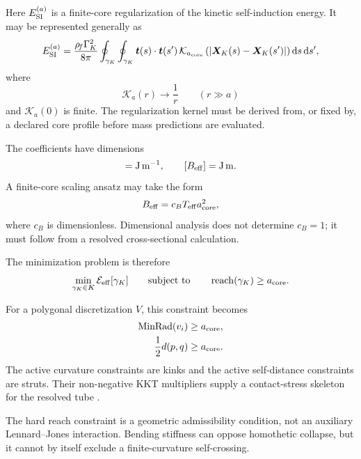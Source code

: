 Here \(E_{\rm SI}^{(a)}\) is a finite-core regularization of the kinetic
self-induction energy.  It may be represented generally as
\begin{equation}
E_{\rm SI}^{(a)}
=
\frac{\rho_{\!f}\Gamma_K^2}{8\pi}
\oint_{\gamma_K}
\oint_{\gamma_K}
\bm{t}(s)\cdot\bm{t}(s')\,
\mathcal{K}_{a_{\rm core}}
\left(
\left|
\bm{X}_K(s)-\bm{X}_K(s')
\right|
\right)
\dd s\,\dd s',
\label{eq:RT-regularized-self-induction}
\end{equation}
where
\begin{equation}
\mathcal{K}_{a}(r)
\longrightarrow
\frac{1}{r}
\qquad
(r\gg a)
\end{equation}
and \(\mathcal{K}_{a}(0)\) is finite.  The regularization kernel must be
derived from, or fixed by, a declared core profile before mass predictions
are evaluated.

The coefficients have dimensions
\begin{equation}
[T_{\rm eff}]
=
\mathrm{J\,m^{-1}},
\qquad
[B_{\rm eff}]
=
\mathrm{J\,m}.
\end{equation}
A finite-core scaling ansatz may take the form
\begin{equation}
B_{\rm eff}
=
c_B T_{\rm eff}a_{\rm core}^2,
\label{eq:RT-bending-scaling}
\end{equation}
where \(c_B\) is dimensionless.  Dimensional analysis does not determine
\(c_B=1\); it must follow from a resolved cross-sectional calculation.

The minimization problem is therefore
\begin{equation}
\min_{\gamma_K\in K}
\mathcal{E}_{\rm eff}[\gamma_K]
\qquad
\text{subject to}
\qquad
\operatorname{reach}(\gamma_K)
\geq
a_{\rm core}.
\label{eq:RT-constrained-minimization}
\end{equation}

For a polygonal discretization \(V\), this constraint becomes
\begin{align}
\operatorname{MinRad}(v_i)
&\geq
a_{\rm core},
\\
\frac{1}{2}d(p,q)
&\geq
a_{\rm core}.
\end{align}
The active curvature constraints are kinks and the active self-distance
constraints are struts.  Their non-negative KKT multipliers supply a
contact-stress skeleton for the resolved tube
\cite{AshtonCantarellaPiatekRawdon2011}.

The hard reach constraint is a geometric admissibility condition, not an
auxiliary Lennard--Jones interaction.  Bending stiffness can oppose
homothetic collapse, but it cannot by itself exclude a finite-curvature
self-crossing.

